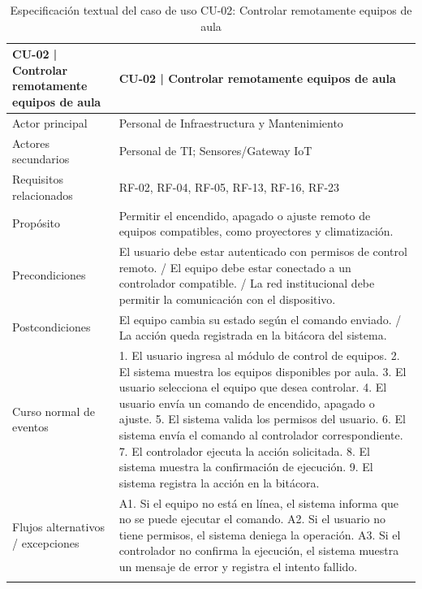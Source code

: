 \begingroup
\small
\begin{longtable}{|p{7.8cm}|p{7.8cm}|}
\hline
CU-02 | Controlar remotamente equipos de aula & CU-02 | Controlar remotamente equipos de aula \\ \hline
Actor principal & Personal de Infraestructura y Mantenimiento \\ \hline
Actores secundarios & Personal de TI; Sensores/Gateway IoT \\ \hline
Requisitos relacionados & RF-02, RF-04, RF-05, RF-13, RF-16, RF-23 \\ \hline
Propósito & Permitir el encendido, apagado o ajuste remoto de equipos compatibles, como proyectores y climatización. \\ \hline
Precondiciones & El usuario debe estar autenticado con permisos de control remoto. / El equipo debe estar conectado a un controlador compatible. / La red institucional debe permitir la comunicación con el dispositivo. \\ \hline
Postcondiciones & El equipo cambia su estado según el comando enviado. / La acción queda registrada en la bitácora del sistema. \\ \hline
Curso normal de eventos & 1. El usuario ingresa al módulo de control de equipos. 2. El sistema muestra los equipos disponibles por aula. 3. El usuario selecciona el equipo que desea controlar. 4. El usuario envía un comando de encendido, apagado o ajuste. 5. El sistema valida los permisos del usuario. 6. El sistema envía el comando al controlador correspondiente. 7. El controlador ejecuta la acción solicitada. 8. El sistema muestra la confirmación de ejecución. 9. El sistema registra la acción en la bitácora. \\ \hline
Flujos alternativos / excepciones & A1. Si el equipo no está en línea, el sistema informa que no se puede ejecutar el comando. A2. Si el usuario no tiene permisos, el sistema deniega la operación. A3. Si el controlador no confirma la ejecución, el sistema muestra un mensaje de error y registra el intento fallido. \\ \hline
\caption{Especificación textual del caso de uso CU-02: Controlar remotamente equipos de aula}
\end{longtable}
\endgroup

